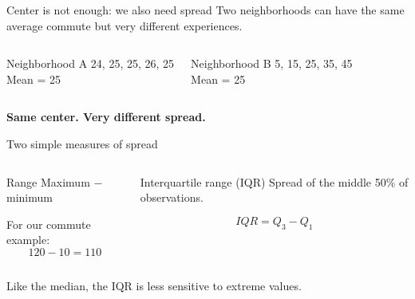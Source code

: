 \documentclass[11pt,aspectratio=169]{beamer}
\newcommand{\bigquestion}[1]{%
\begin{center}
\begin{minipage}{0.88\textwidth}
\centering
\Large\color{LBJnavy}\textbf{#1}
\end{minipage}
\end{center}}
\begin{document}
\begin{frame}{Center is not enough: we also need spread}
Two neighborhoods can have the same average commute but very different experiences.

\vspace{0.6em}
\begin{columns}[T,onlytextwidth]
\begin{block}{Neighborhood A}
24, 25, 25, 26, 25\\[0.5em]
Mean = 25
\end{block}
\begin{block}{Neighborhood B}
5, 15, 25, 35, 45\\[0.5em]
Mean = 25
\end{block}
\end{columns}
\vfill \pause
\bigquestion{Same center. Very different spread.}
\end{frame}

\begin{frame}{Two simple measures of spread}
\begin{columns}[T,onlytextwidth]
\begin{block}{Range}
Maximum $-$ minimum

\vspace{0.4em}
For our commute example:
\[
120-10=110
\]
\end{block}
\begin{block}{Interquartile range (IQR)}
Spread of the middle 50\% of observations.

\vspace{0.4em}
\[
IQR=Q_3-Q_1
\]
\end{block}
\end{columns}
\vfill
\alert{Like the median, the IQR is less sensitive to extreme values.}
\end{frame}
\end{document}
